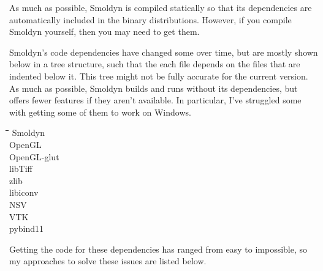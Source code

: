 \documentclass {book}
\begin{document}
As much as possible, Smoldyn is compiled statically so that its dependencies are automatically included in the binary distributions. However, if you compile Smoldyn yourself, then you may need to get them.

Smoldyn's code dependencies have changed some over time, but are mostly shown below in a tree structure, such that the each file depends on the files that are indented below it. This tree might not be fully accurate for the current version. As much as possible, Smoldyn builds and runs without its dependencies, but offers fewer features if they aren't available. In particular, I've struggled some with getting some of them to work on Windows.

\begin{tabbing}
\hspace{0.25in}\=\hspace{0.25in}\=\hspace{0.25in}\=\hspace{0.25in}\=\hspace{0.25in}\=\kill
\>Smoldyn\\
\>\>OpenGL\\
\>\>OpenGL-glut\\
\>\>libTiff\\
\>\>zlib\\
\>\>libiconv\\
\>\>NSV\\
\>\>\>VTK\\
\>\>pybind11\\
\end{tabbing}

Getting the code for these dependencies has ranged from easy to impossible, so my approaches to solve these issues are listed below.
\end{document}
